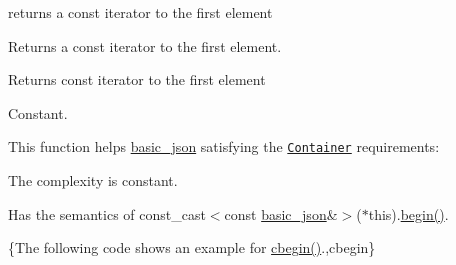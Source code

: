 returns a const iterator to the first element 

Returns a const iterator to the first element.

 \begin{DoxyReturn}{Returns}
const iterator to the first element
\end{DoxyReturn}
Constant.

This function helps {\ttfamily \hyperlink{classnlohmann_1_1basic__json}{basic\-\_\-json}} satisfying the \href{http://en.cppreference.com/w/cpp/concept/Container}{\tt Container} requirements\-:
\begin{DoxyItemize}
\item The complexity is constant.
\item Has the semantics of {\ttfamily const\-\_\-cast$<$const \hyperlink{classnlohmann_1_1basic__json}{basic\-\_\-json}\&$>$($\ast$this).\hyperlink{classnlohmann_1_1basic__json_ad4e381c54039607be08d7af41a1f6ad1}{begin()}}.
\end{DoxyItemize}

\{The following code shows an example for {\ttfamily \hyperlink{classnlohmann_1_1basic__json_a7355a41b0033ff8a27d58550544d5a59}{cbegin()}}.,cbegin\}

